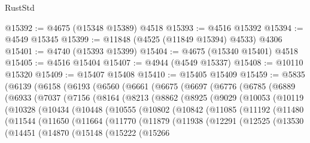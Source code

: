 \begin{lexlean}{RustStd}
\begin{coremodule}
{\begin{coremodule}
{{{{{{{{{{{{{{{{{{{{{{{{{{{{{{{{{{{{{{{{{{{{{{{{{{{{{{{{{{{{@15392 := @4675 (@15348 @15389) @4518
@15393 := @4516 @15392
@15394 := @4549 @15345
@15399 := @11848 (@4525 (@11849 @15394) @4533) @4306
@15401 := @4740 (@15393 @15399)
@15404 := @4675 (@15340 @15401) @4518
@15405 := @4516 @15404
@15407 := @4944 (@4549 @15337)
@15408 := @10110 @15320
@15409 := @15407 @15408
@15410 := @15405 @15409
@15459 := @5835
    (@6139
      (@6158
        (@6193
          (@6560
            (@6661
              (@6675
                (@6697
                  (@6776
                    (@6785
                      (@6889
                        (@6933
                          (@7037
                            (@7156
                              (@8164
                                (@8213
                                  (@8862
                                    (@8925
                                      (@9029
                                        (@10053
                                          (@10119
                                            (@10328
                                              (@10434
                                                (@10448
                                                  (@10555
                                                    (@10802
                                                      (@10842
                                                        (@11085
                                                          (@11192
                                                            (@11480
                                                              (@11544
                                                                (@11650
                                                                  (@11664
                                                                    (@11770
                                                                      (@11879
                                                                        (@11938
                                                                          (@12291
                                                                            (@12525
                                                                              (@13530
                                                                                (@14451
                                                                                  (@14870
                                                                                    (@15148
                                                                                      (@15222
                                                                                        (@15266
}}}}}}}}}}}}}}}}}}}}}}}}}}}}}}}}}}}}}}}}}}}}}}}}}}}}}}}}}}}}
\end{coremodule}}
\end{coremodule}
\end{lexlean}

